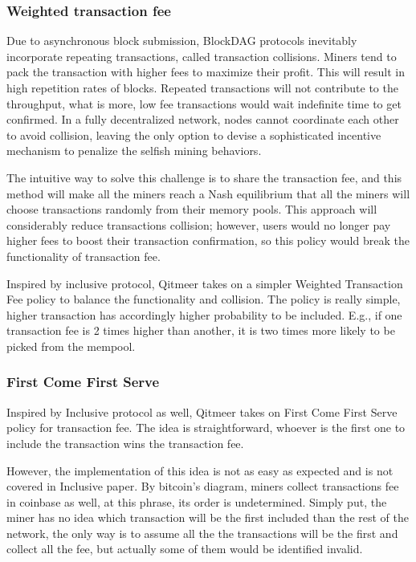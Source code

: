 \documentclass[a4paper,11pt]{article}
\begin{document}
\subsubsection{Weighted transaction fee}
Due to asynchronous block submission, BlockDAG protocols inevitably incorporate repeating transactions, called transaction collisions.
Miners tend to pack the transaction with higher fees to maximize their profit. This will result in high repetition rates of blocks. Repeated transactions will not contribute to the throughput, what is more, low fee transactions would wait indefinite time to get confirmed. In a fully decentralized network, nodes cannot coordinate each other to avoid collision, leaving the only option to devise a sophisticated incentive mechanism to penalize the selfish mining behaviors.

The intuitive way to solve this challenge is to share the transaction fee, and this method will make all the miners reach a Nash equilibrium that all the miners will choose transactions randomly from their memory pools. This approach will considerably reduce transactions collision; however, users would no longer pay higher fees to boost their transaction confirmation, so this policy would break the functionality of transaction fee.

Inspired by inclusive protocol, Qitmeer takes on a simpler Weighted Transaction Fee policy to balance the functionality and collision. The policy is really simple, higher transaction has accordingly higher probability to be included. E.g., if one transaction fee is 2 times higher than another, it is two times more likely to be picked from the mempool.

\subsubsection{First Come First Serve}
Inspired by Inclusive protocol as well, Qitmeer takes on First Come First Serve policy for transaction fee. The idea is straightforward, whoever is the first one to include the transaction wins the transaction fee.

However, the implementation of this idea is not as easy as expected and is not covered in Inclusive paper. By bitcoin's diagram, miners collect transactions fee in coinbase as well, at this phrase, its order is undetermined. Simply put, the miner has no idea which transaction will be the first included than the rest of the network, the only way is to assume all the the transactions will be the first and collect all the fee, but actually some of them would be identified invalid.
\end{document}
